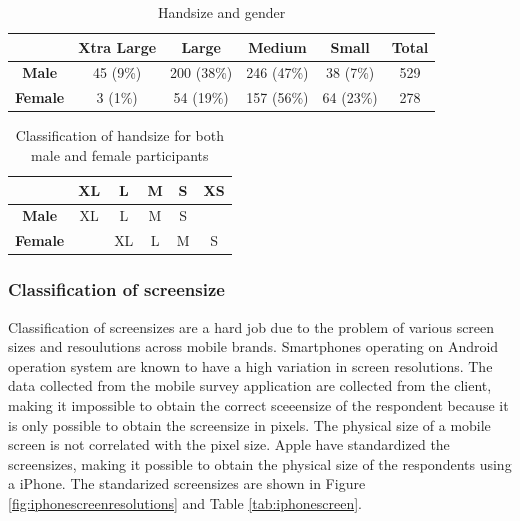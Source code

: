 {{    %
    \begin{table}[H]
      \centering
      \begin{tabular}{ c || c | c | c | c || c }
        \hline
        & {\bf Xtra Large} & {\bf Large} & {\bf Medium} & {\bf Small} & {\bf Total}\\ \hline
        {\bf Male} & 45 (9\%) & 200 (38\%) & 246 (47\%) & 38 (7\%) & 529 \\
        {\bf Female} & 3 (1\%) & 54 (19\%) & 157 (56\%) & 64 (23\%) & 278 \\ \hline
      \end{tabular}
      \caption{Handsize and gender}
      \label{tab:HandsizeGender}
    \end{table}

    \begin{table}[H]
      \centering
      \begin{tabular}{ c || c | c | c | c | c }
        \hline
         & {\bf XL} & {\bf L} & {\bf M} & {\bf S} & {\bf XS} \\ \hline\hline
        {\bf Male}   & XL & L  & M & S &   \\
        {\bf Female} &    & XL & L & M & S \\ \hline
      \end{tabular}
      \caption{Classification of handsize for both male and female participants}
      \label{tab:classificationhandsize}
    \end{table}

    \clearpage
    \subsubsection{Classification of screensize}


    Classification of screensizes are a hard job due to the problem of various screen sizes and resoulutions across mobile brands. Smartphones operating on Android operation system are known to have a high variation in screen resolutions. The data collected from the mobile survey application are collected from the client, making it impossible to obtain the correct sceeensize of the respondent because it is only possible to obtain the screensize in pixels. The physical size of a mobile screen is not correlated with the pixel size. Apple have standardized the screensizes, making it possible to obtain the physical size of the respondents using a iPhone. The standarized screensizes are shown in Figure \ref{fig:iphonescreenresolutions} and Table \ref{tab:iphonescreen}.

}}
